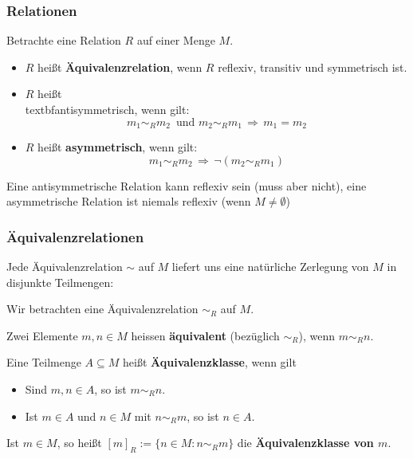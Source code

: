\documentclass[hyperref={pdfpagelabels=false}]{beamer}
\theoremstyle{plain}%
\theoremstyle{definition}
\theoremstyle{remark}
\begin{document}
\begin{frame}
\frametitle{Relationen}

\begin{definition} Betrachte eine Relation $R$ auf einer Menge $M$.

\begin{itemize} 
\item<2-> $R$ heißt \textbf{Äquivalenzrelation}, wenn $R$ reflexiv, 
transitiv und symmetrisch ist.
\item<3-> $R$ heißt \\textbf{antisymmetrisch}, wenn gilt:
\vspace{-0.3cm}
   	$$ m_1 \sim_R m_2 \, \textrm{ und } m_2 \sim_R m_1 \, \Longrightarrow \, m_1 = m_2 $$
\item<4-> $R$ heißt \textbf{asymmetrisch}, wenn gilt:
\vspace{-0.3cm}
   	$$ m_1 \sim_R m_2 \, \Longrightarrow \, \neg \left( m_2 \sim_R m_1 \right) $$
\vspace{-0.3cm}
\end{itemize}
\end{definition}
\bigbreak

\pause \pause \pause \pause 

Eine antisymmetrische Relation kann reflexiv sein (muss aber nicht), eine asymmetrische Relation 
ist niemals reflexiv (wenn $M \neq \emptyset$)

\end{frame}

\begin{frame}
\frametitle{Äquivalenzrelationen}

Jede Äquivalenzrelation $\sim$ auf $M$ liefert uns eine natürliche Zerlegung von $M$ in disjunkte Teilmengen:

\pause 

\begin{definition} Wir betrachten eine Äquivalenzrelation $\sim_R$ auf $M$.

\pause 

Zwei Elemente $m, n \in M$ hei{ss}en \textbf{äquivalent} (bezüglich $\sim_R$), wenn $m \sim_R n$.

\pause 
Eine Teilmenge $A \subseteq M$ heißt \textbf{Äquivalenzklasse}, wenn gilt

\begin{itemize}
\item<5-> Sind $m, n \in A$, so ist $m \sim_R n$.
\item<6-> Ist $m \in A$ und $n \in M$ mit $n \sim_R m$, so ist $n \in A$.
\end{itemize}

\pause \pause \pause
Ist $m \in M$, so heißt $[m]_R := \{ n \in M: n \sim_R m \}$ die \textbf{Äquivalenzklasse von $m$}.
\end{definition}
\end{frame}
\end{document}
